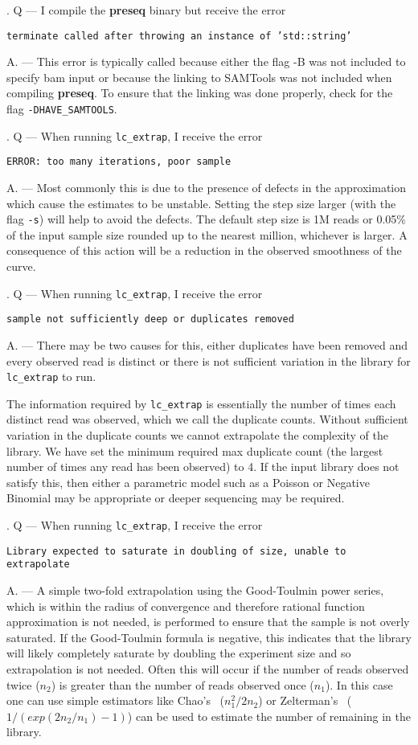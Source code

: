 \documentclass[11pt, titlepage]{article}
\newcounter{question}
\newcommand\Que[1]{%
   \leavevmode\par
   \stepcounter{question}
   \noindent
   \thequestion. Q --- #1\par}
\newcommand\Ans[1]{%
    \leavevmode\par\noindent
   {\leftskip37pt
    A. --- #1 \par }}
\newcommand{\fn}[1]{\texttt{#1}}
\begin{document}
\Que{I compile the \textbf{preseq} binary but receive the error

\fn{terminate called after throwing an instance of 'std::string'}
}

\Ans{This error is typically called because either the flag -B was not included to
specify bam input or because the linking to SAMTools was not included when
compiling \textbf{preseq}.  To ensure that the linking was done properly, check for the flag
\fn{-DHAVE\_SAMTOOLS}.}

\Que{When running \fn{lc\_extrap}, I receive the error

\fn{ERROR:  too many iterations, poor sample}

}

\Ans{
Most commonly this is due to the presence of
defects in the approximation which cause the estimates to be unstable.  Setting the step
size larger (with the flag \fn{-s}) will help to avoid the defects.  The default step size is 1M reads or
0.05\% of the input sample size rounded up to the nearest million, whichever is larger.
A consequence of this action will be a reduction in the observed smoothness of the curve.
}


\Que{When running \fn{lc\_extrap}, I receive the error

\fn{sample not sufficiently deep or duplicates removed}
}

\Ans{There may be two causes for this, either duplicates have been removed and
every observed read is distinct or there is not sufficient variation in the library for
\fn{lc\_extrap} to run.

The information required by \fn{lc\_extrap} is essentially the number of times each
distinct read was observed, which we call the duplicate counts.
Without sufficient variation in the duplicate counts we cannot extrapolate the
complexity of the library.  We have set the minimum required max duplicate count
(the largest number of times any read has been observed) to 4.
If the input library does not satisfy this, then either a parametric model such
as a Poisson or Negative Binomial may be appropriate or deeper
sequencing may be required.}

\Que{When running \fn{lc\_extrap}, I receive the error

\fn{Library expected to saturate in doubling of size, unable to extrapolate}
}

\Ans{
A simple two-fold extrapolation using the Good-Toulmin
power series, which is within the radius of convergence and
therefore rational function approximation is not needed,
is performed to ensure that the sample is not overly saturated.
If the Good-Toulmin formula is negative, this indicates that the
library will likely completely saturate by doubling the experiment
size and so extrapolation is not needed.  Often this will occur
if the number of reads observed twice ($n_{2}$) is greater than the number
of reads observed once ($n_{1}$).  In this case one can use
simple estimators like Chao's~\cite{chao1987estimating} ($n_{1}^2 / 2 n_{2}$)
or Zelterman's~\cite{zelterman1988robust}
($1 / (exp(2 n_{2}/ n_{1}) - 1)$) can be used to estimate
the number of remaining in the library.
}
\end{document}

